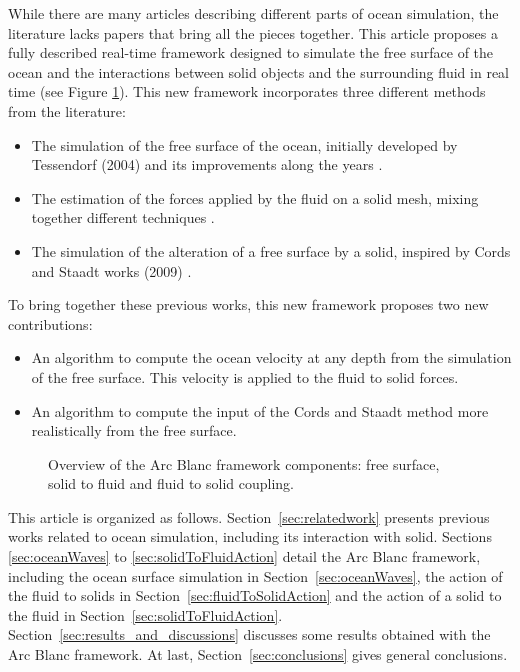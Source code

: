 \documentclass[final]{jcgt}
\def\framework{the Arc Blanc framework\xspace}
\begin{document}
While there are many articles describing different parts of ocean simulation, the literature lacks papers that bring all the pieces together.
This article proposes a fully described real-time framework designed to simulate the free surface of the ocean and the interactions between solid objects and the surrounding fluid in real time (see Figure \ref{fig:overviewFramework}).
This new framework incorporates three different methods from the literature:
\begin{itemize}
	\item The simulation of the free surface of the ocean, initially developed by Tessendorf (2004) \cite{tessendorfSimulatingOceanWater1999} and its improvements along the years \cite{horvathEmpiricalDirectionalWave2015,tessendorfGilliganPrototypeFramework2017}.
	\item The estimation of the forces applied by the fluid on a solid mesh, mixing together different techniques \cite{yukselRealtimeWaterWaves2010,kellomakiRigidBodyInteraction2014}.
	\item The simulation of the alteration of a free surface by a solid, inspired by Cords and Staadt works (2009) \cite{cordsRealTimeOpenWater2009}.
\end{itemize}
To bring together these previous works, this new framework proposes two new contributions:
\begin{itemize}
	\item An algorithm to compute the ocean velocity at any depth from the simulation of the free surface. This velocity is applied to the fluid to solid forces.
	\item An algorithm to compute the input of the Cords and Staadt method more realistically from the free surface.
\end{itemize}



\begin{figure}
	\centering
	
	\caption{Overview of \framework components: free surface, solid to fluid and fluid to solid coupling.}
	\label{fig:overviewFramework}
\end{figure}

This article is organized as follows.
Section~\ref{sec:relatedwork} presents previous works related to ocean simulation, including its interaction with solid.
Sections \ref{sec:oceanWaves} to \ref{sec:solidToFluidAction} detail \framework, including the ocean surface simulation in Section~\ref{sec:oceanWaves}, the action of the fluid to solids in Section~\ref{sec:fluidToSolidAction} and the action of a solid to the fluid in Section~\ref{sec:solidToFluidAction}.
Section~\ref{sec:results_and_discussions} discusses some results obtained with \framework.
At last, Section~\ref{sec:conclusions} gives general conclusions.
\end{document}
